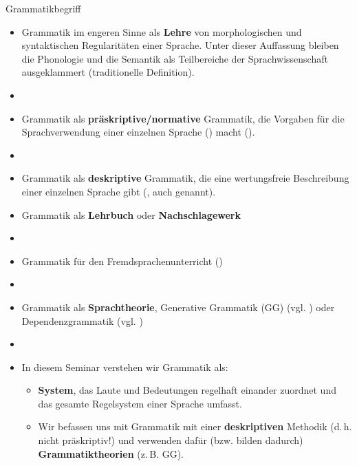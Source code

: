 \begin{frame}{Grammatikbegriff}

\begin{itemize}
	\item<1-> Grammatik im engeren Sinne als \textbf{Lehre} von morphologischen und syntaktischen Regularitäten einer Sprache. Unter dieser Auffassung bleiben die Phonologie und die Semantik als Teilbereiche der Sprachwissenschaft ausgeklammert (traditionelle Definition).
	\item[]
	\item<2-> Grammatik als \textbf{präskriptive/normative} Grammatik, die Vorgaben für die  Sprachverwendung einer einzelnen Sprache () macht (\zB \citealp{DudenGramm09d}).
	\item[]
	\item<3-> Grammatik als \textbf{deskriptive} Grammatik, die eine wertungsfreie Beschreibung einer einzelnen Sprache gibt (\zB \citealp{Eisenberg00a}, auch  genannt).
\end{itemize}

\end{frame}


\begin{frame}

\begin{itemize}
	\item<1-> Grammatik als \textbf{Lehrbuch} oder \textbf{Nachschlagewerk}
	\item[]
	\item<2-> Grammatik für den Fremdsprachenunterricht (\zB \citealp{Helbig&Buscha05a})
	\item[]
	\item<3-> Grammatik als \textbf{Sprachtheorie}, \zB Generative Grammatik (GG) (vgl. \citealp{Philippi&Tewes10a}) oder Dependenzgrammatik (vgl. \citealp{Agel00a})
	\item[]
	\item<4-> In diesem Seminar verstehen wir Grammatik als:

	\begin{itemize}
		\item<4-> \textbf{System}, das Laute und Bedeutungen regelhaft einander zuordnet und das gesamte Regelsystem einer Sprache umfasst.
		\item<4-> Wir befassen uns mit Grammatik mit einer \textbf{deskriptiven} Methodik
                  (d.\,h. nicht präskriptiv!) und verwenden dafür (bzw. bilden dadurch)
                  \textbf{Grammatiktheorien} (z.\,B. GG).
	\end{itemize}

\end{itemize}

\end{frame}


